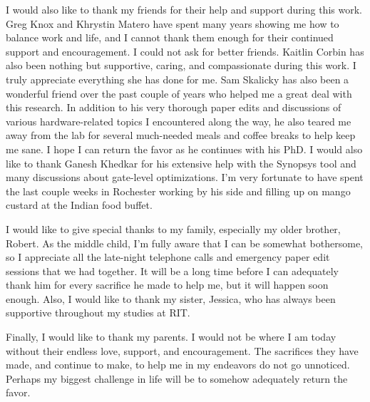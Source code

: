 \documentclass[11pt,american]{report}
\begin{document}
I would also like to thank my friends for their help and support during this work. Greg Knox and Khrystin Matero have spent many years showing me how to balance work and life, and I cannot thank them enough for their continued support and encouragement. I could not ask for better friends. Kaitlin Corbin has also been nothing but supportive, caring, and compassionate during this work. I truly appreciate everything she has done for me. Sam Skalicky has also been a wonderful friend over the past couple of years who helped me a great deal with this research. In addition to his very thorough paper edits and discussions of various hardware-related topics I encountered along the way, he also teared me away from the lab for several much-needed meals and coffee breaks to help keep me sane. I hope I can return the favor as he continues with his PhD. I would also like to thank Ganesh Khedkar for his extensive help with the Synopsys tool and many discussions about gate-level optimizations. I'm very fortunate to have spent the last couple weeks in Rochester working by his side and filling up on mango custard at the Indian food buffet. 

I would like to give special thanks to my family, especially my older brother, Robert. As the middle child, I'm fully aware that I can be somewhat bothersome, so I appreciate all the late-night telephone calls and emergency paper edit sessions that we had together. It will be a long time before I can adequately thank him for every sacrifice he made to help me, but it will happen soon enough. Also, I would like to thank my sister, Jessica, who has always been supportive throughout my studies at RIT.

Finally, I would like to thank my parents. I would not be where I am today without their endless love, support, and encouragement. The sacrifices they have made, and continue to make, to help me in my endeavors do not go unnoticed. Perhaps my biggest challenge in life will be to somehow adequately return the favor.
\vfill

\newcommand{\etc} {\emph{etc.\/}}
\newcommand{\etal}{\emph{et~al.\/}}
\newcommand{\eg}  {\emph{e.g.\/}}
\newcommand{\ie}  {\emph{i.e.\/}}
\end{document}

